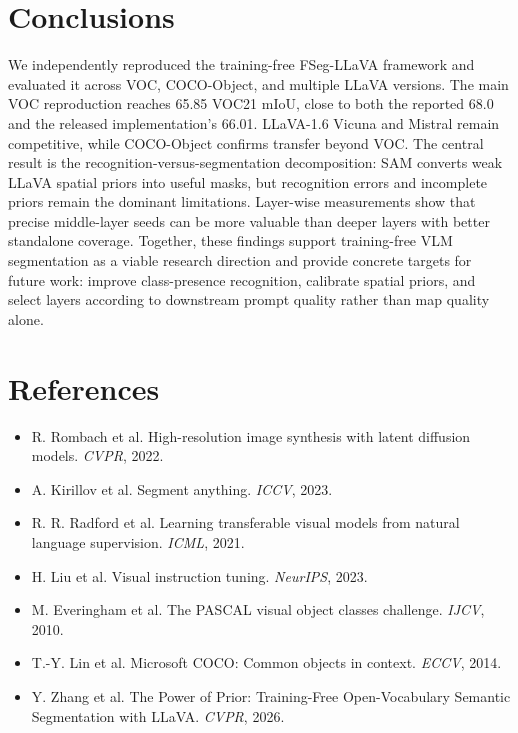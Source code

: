 \documentclass{article}
\newcommand{\method}{FSeg-LLaVA}
\newcommand{\miou}{mIoU}
\begin{document}
\section{Conclusions}
\label{sec:conclusion}
We independently reproduced the training-free \method{} framework and evaluated it across VOC,
COCO-Object, and multiple LLaVA versions. The main VOC reproduction reaches 65.85 VOC21 \miou{},
close to both the reported 68.0 and the released implementation's 66.01. LLaVA-1.6 Vicuna and
Mistral remain competitive, while COCO-Object confirms transfer beyond VOC. The central result is
the recognition-versus-segmentation decomposition: SAM converts weak LLaVA spatial priors into
useful masks, but recognition errors and incomplete priors remain the dominant limitations.
Layer-wise measurements show that precise middle-layer seeds can be more valuable than deeper
layers with better standalone coverage. Together, these findings support training-free VLM
segmentation as a viable research direction and provide concrete targets for future work: improve
class-presence recognition, calibrate spatial priors, and select layers according to downstream
prompt quality rather than map quality alone.

\section*{References}
\small
\begin{itemize}
\item R. Rombach et al. High-resolution image synthesis with latent diffusion models. \emph{CVPR}, 2022.
\item A. Kirillov et al. Segment anything. \emph{ICCV}, 2023.
\item R. R. Radford et al. Learning transferable visual models from natural language supervision.
\emph{ICML}, 2021.
\item H. Liu et al. Visual instruction tuning. \emph{NeurIPS}, 2023.
\item M. Everingham et al. The PASCAL visual object classes challenge. \emph{IJCV}, 2010.
\item T.-Y. Lin et al. Microsoft COCO: Common objects in context. \emph{ECCV}, 2014.
\item Y. Zhang et al. The Power of Prior: Training-Free Open-Vocabulary Semantic Segmentation with
LLaVA. \emph{CVPR}, 2026.
\end{itemize}
\end{document}
